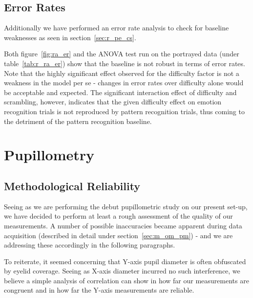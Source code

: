 	\subsection{Error Rates}\label{sec:r_ra_er}
	    Additionally we have performed an error rate analysis to check for baseline weaknesses as seen in section~\ref{sec:r_pe_cs}.
	    
	    Both figure~\ref{fig:ra_er} and the ANOVA test run on the portrayed data (under table~\ref{tab:r_ra_er}) show that the baseline is not robust in terms of error rates.
	    Note that the highly significant effect observed for the difficulty factor is not a weakness in the model per se - changes in error rates over difficulty alone would be acceptable and expected.
	    The significant interaction effect of difficulty and scrambling, however, indicates that the given difficulty effect on emotion recognition trials is not reproduced by pattern recognition trials, thus coming to the detriment of the pattern recognition baseline.	    
    
    \section{Pupillometry}\label{sec:r_p}
	\subsection{Methodological Reliability}\label{sec:r_p_mr}
	    Seeing as we are performing the debut pupillometric study on our present set-up, we have decided to perform at least a rough assessment of the quality of our measurements.
	    A number of possible inaccuracies became apparent during data acquisition (described in detail under section~\ref{sec:m_om_pm}) - 
	    and we are addressing these accordingly in the following paragraphs.
	    
	    To reiterate, it seemed concerning that Y-axis pupil diameter is often obfuscated by eyelid coverage.
	    Seeing as X-axis diameter incurred no such interference, we believe a simple analysis of correlation can show in how far our measurements are congruent and in how far the Y-axis measurements are reliable.
	    
